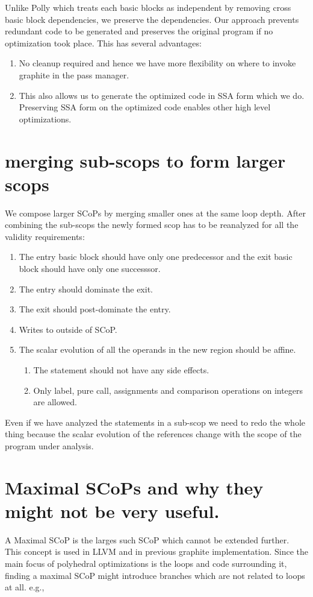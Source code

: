 \documentclass{sigplanconf}
\begin{document}
Unlike Polly which treats each basic blocks as independent by removing cross basic block dependencies, we preserve
the dependencies. Our approach prevents redundant code to be generated and preserves the original program
if no optimization took place. This has several advantages:
\begin{enumerate}
  \item No cleanup required and hence we have more flexibility on where to invoke graphite in the pass manager.
  \item This also allows us to generate the optimized code in SSA form which we do. Preserving SSA form on the optimized
    code enables other high level optimizations.
\end{enumerate}


\section{merging sub-scops to form larger scops}
We compose larger SCoPs by merging smaller ones at the same loop depth. After combining the sub-scops
the newly formed scop has to be reanalyzed for all the validity requirements:
\begin{enumerate}
  \item The entry basic block should have only one predecessor and the exit basic block should have only one
    successsor.
  \item The entry should dominate the exit.
  \item The exit should post-dominate the entry.
  \item Writes to outside of SCoP.
  \item The scalar evolution of all the operands in the new region should be affine.

    \begin{enumerate}
      \item The statement should not have any side effects.
      \item Only label, pure call, assignments and comparison operations on integers are allowed.
    \end{enumerate}
\end{enumerate}

Even if we have analyzed the statements in a sub-scop we need to redo the whole thing because the scalar evolution
of the references change with the scope of the program under analysis.

\section{Maximal SCoPs and why they might not be very useful.}
A Maximal SCoP is the larges such SCoP which cannot be extended further. This concept is used
in LLVM 
and in previous graphite implementation.
Since the main focus of
polyhedral optimizations is the loops and code surrounding it, finding a maximal SCoP might introduce branches
which are not related to loops at all. e.g.,
\end{document}
